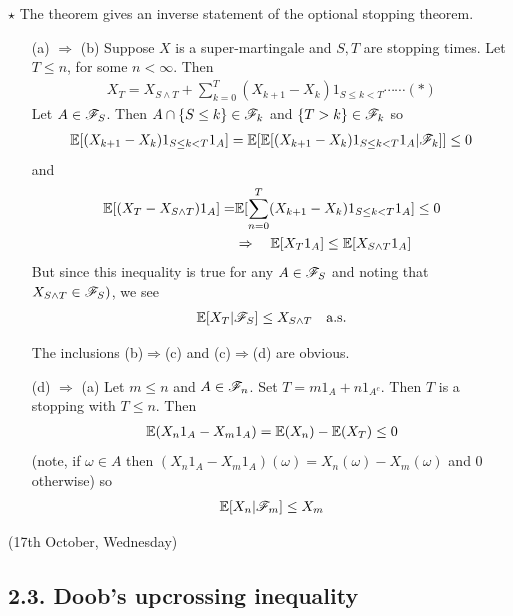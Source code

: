 \documentclass[10pt,a4paper]{report}
\newenvironment{proof}
{\begin{changemargin}{1cm}{0.5cm} 
	}%
	{\end{changemargin}
}
\begin{document}
$\star$ The theorem gives an inverse statement of the optional stopping theorem.
\s

\begin{proof}
\pf

\begin{itemize}
\item[(a) $\Rightarrow$ (b)] Suppose $X$ is a super-martingale and $S,T$ are stopping times. Let $T\leq n$, for some $n<\infty$. Then
\begin{align*}
X_T = X_{S\wedge T} + \sum_{k=0}^T (X_{k+1} - X_k) 1_{S\leq k<T} \cdots \cdots (*)
\end{align*}
Let $A \in \mathscr{F}_S$. Then $A\cap \{ S\leq k\}\in \mathscr{F}_k$ and $\{T>k\} \in \mathscr{F}_k$ so
\begin{align*}
\mathbb{E}[(X_{k+1} - X_k) 1_{S\leq k<T} 1_A] =\mathbb{E}[\mathbb{E}[(X_{k+1} - X_k) 1_{S\leq k<T} 1_A|\mathscr{F}_k]] \leq 0
\end{align*}
and
\begin{align*}
\mathbb{E}[(X_T - X_{S\wedge T}) 1_A] = & \mathbb{E}[\sum_{n=0}^T (X_{k+1} - X_k) 1_{S\leq k<T} 1_A] \leq 0 \\
& \Rightarrow \quad \mathbb{E}[ X_T 1_A] \leq \mathbb{E}[X_{S\wedge T} 1_A] \\
\end{align*}
But since this inequality is true for any $A\in \mathscr{F}_S$ and noting that $X_{S\wedge T} \in \mathscr{F}_S)$, we see
\begin{align*}
\mathbb{E}[X_T |\mathscr{F}_S] \leq X_{S\wedge T} \quad \text{a.s.}
\end{align*}
\s

The inclusions (b)$\Rightarrow$(c) and (c)$\Rightarrow$(d) are obvious.
\s

\item[(d) $\Rightarrow$ (a)] Let $m\leq n$ and $A\in \mathscr{F}_n$. Set $T= m1_A + n1_{A^c}$. Then $T$ is a stopping with $T\leq n$. Then
\begin{align*}
\mathbb{E}(X_n 1_A -X_m 1_A) = \mathbb{E}(X_n) - \mathbb{E}(X_T) \leq 0
\end{align*}
(note, if $\omega \in A$ then $(X_n1_A - X_m1_A)(\omega) = X_n(\omega) -X_m(\omega)$ and $0$ otherwise) so
\begin{align*}
\mathbb{E}[X_n | \mathscr{F}_m] \leq X_m
\end{align*}
\end{itemize}
\eop
\end{proof}
\s

\newday

(17th October, Wednesday)
\s

\subsection*{2.3. Doob's upcrossing inequality}
\end{document}
